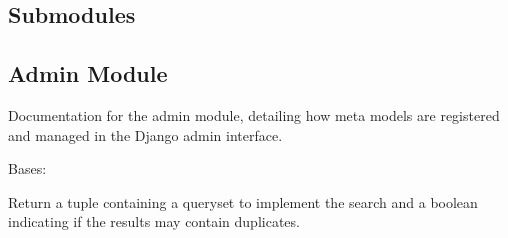 \documentclass[letterpaper,10pt,english]{sphinxmanual}
\begin{document}
\subsection{Submodules}
\label{\detokenize{source/meta_models_management:submodules}}

\subsection{Admin Module}
\label{\detokenize{source/meta_models_management:admin-module}}
\sphinxAtStartPar
Documentation for the admin module, detailing how meta models are registered and managed in the Django admin interface.
\label{\detokenize{source/meta_models_management:module-meta_models_management.admin}}

\begin{fulllineitems}
\label{\detokenize{source/meta_models_management:meta_models_management.admin.AIDetectionAdmin}}
\pysigstartsignatures
{}
\pysigstopsignatures
\sphinxAtStartPar
Bases: 

\begin{fulllineitems}
\label{\detokenize{source/meta_models_management:meta_models_management.admin.AIDetectionAdmin.get_search_results}}
\pysigstartsignatures
{}
\pysigstopsignatures
\sphinxAtStartPar
Return a tuple containing a queryset to implement the search
and a boolean indicating if the results may contain duplicates.

\end{fulllineitems}


\end{fulllineitems}
\end{document}

